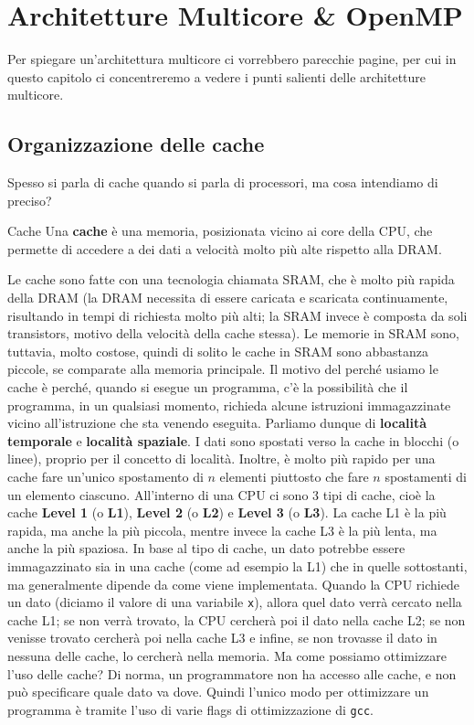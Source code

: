 \chapter{Architetture Multicore \texorpdfstring{\&}{&} OpenMP}

Per spiegare un'architettura multicore ci vorrebbero parecchie pagine, per cui in questo capitolo ci concentreremo a vedere i punti salienti delle architetture multicore.

\section{Organizzazione delle cache}

Spesso si parla di cache quando si parla di processori, ma cosa intendiamo di preciso?

\begin{definition}{Cache}
    Una \textbf{cache} è una memoria, posizionata vicino ai core della CPU, che permette di accedere a dei dati a velocità molto più alte rispetto alla DRAM.
\end{definition}

Le cache sono fatte con una tecnologia chiamata SRAM, che è molto più rapida della DRAM (la DRAM necessita di essere caricata e scaricata continuamente, risultando in tempi di richiesta molto più alti; la SRAM invece è composta da soli transistors, motivo della velocità della cache stessa). Le memorie in SRAM sono, tuttavia, molto costose, quindi di solito le cache in SRAM sono abbastanza piccole, se comparate alla memoria principale.
\nl
Il motivo del perché usiamo le cache è perché, quando si esegue un programma, c'è la possibilità che il programma, in un qualsiasi momento, richieda alcune istruzioni immagazzinate vicino all'istruzione che sta venendo eseguita. Parliamo dunque di \textbf{località temporale} e \textbf{località spaziale}.
\nl
I dati sono spostati verso la cache in blocchi (o linee), proprio per il concetto di località. Inoltre, è molto più rapido per una cache fare un'unico spostamento di $n$ elementi piuttosto che fare $n$ spostamenti di un elemento ciascuno.
\nl
All'interno di una CPU ci sono 3 tipi di cache, cioè la cache \textbf{Level 1} (o \textbf{L1}), \textbf{Level 2} (o \textbf{L2}) e \textbf{Level 3} (o \textbf{L3}). La cache L1 è la più rapida, ma anche la più piccola, mentre invece la cache L3 è la più lenta, ma anche la più spaziosa. In base al tipo di cache, un dato potrebbe essere immagazzinato sia in una cache (come ad esempio la L1) che in quelle sottostanti, ma generalmente dipende da come viene implementata.
\nl
Quando la CPU richiede un dato (diciamo il valore di una variabile \verb|x|), allora quel dato verrà cercato nella cache L1; se non verrà trovato, la CPU cercherà poi il dato nella cache L2; se non venisse trovato cercherà poi nella cache L3 e infine, se non trovasse il dato in nessuna delle cache, lo cercherà nella memoria.
\nl
Ma come possiamo ottimizzare l'uso delle cache? Di norma, un programmatore non ha accesso alle cache, e non può specificare quale dato va dove. Quindi l'unico modo per ottimizzare un programma è tramite l'uso di varie flags di ottimizzazione di \verb|gcc|.

